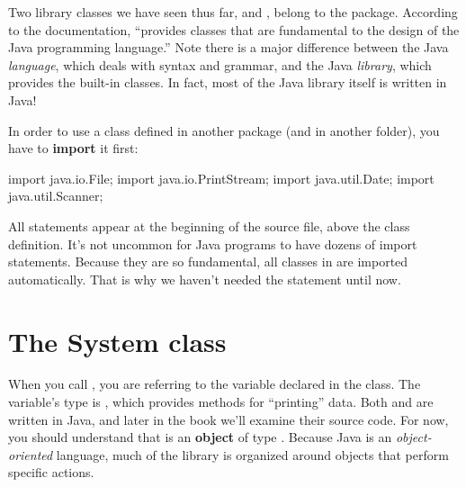Two library classes we have seen thus far,  and , belong to the  package.
According to the documentation,  ``provides classes that are fundamental to the design of the Java programming language.''
Note there is a major difference between the Java {\em language}, which deals with syntax and grammar, and the Java {\em library}, which provides the built-in classes.
In fact, most of the Java library itself is written in Java!


In order to use a class defined in another package (and in another folder), you have to {\bf import} it first:

\begin{code}
import java.io.File;
import java.io.PrintStream;
import java.util.Date;
import java.util.Scanner;
\end{code}

All  statements appear at the beginning of the source file, above the class definition.
It's not uncommon for Java programs to have dozens of import statements.
Because they are so fundamental, all classes in  are imported automatically.
That is why we haven't needed the  statement until now.


\section{The System class}
\label{system}


When you call , you are referring to the  variable declared in the  class.
The  variable's type is , which provides methods for ``printing'' data.
Both  and  are written in Java, and later in the book we'll examine their source code.
For now, you should understand that  is an {\bf object} of type .
Because Java is an {\em object-oriented} language, much of the library is organized around objects that perform specific actions.

